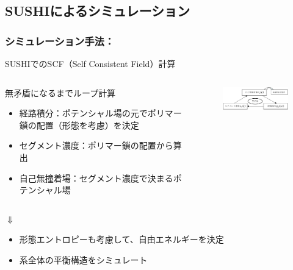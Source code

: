 \documentclass[12pt, dvipdfmx]{beamer}
\begin{document}
\subsection{SUSHIによるシミュレーション}
\begin{frame}
	\frametitle{シミュレーション手法：}
	SUSHIでのSCF（Self Consistent Field）計算
		\begin{columns}
			\begin{column}{6.0cm}
				{\scriptsize
				\begin{block}{無矛盾になるまでループ計算}
				\begin{itemize}
					\item 経路積分：ポテンシャル場の元でポリマー鎖の配置（形態を考慮）を決定
					\item セグメント濃度：ポリマー鎖の配置から算出
					\item 自己無撞着場：セグメント濃度で決まるポテンシャル場
				\end{itemize}
				\end{block}
				}
			\end{column}
			\begin{column}{6.0cm}
				\begin{figure}[!b]
					\begin{center}
						\includegraphics[width=60mm]{scf.png}
					\end{center}
				\end{figure}
			\end{column}
		\end{columns}

		\begin{center}
			{\Large $\Downarrow$}
		\end{center}

		\begin{itemize}
			\item \color{red}形態エントロピーも考慮\color{black}して、自由エネルギーを決定
			\item 系全体の\color{red}平衡構造\color{black}をシミュレート
		\end{itemize}
\end{frame}
%
\end{document}
